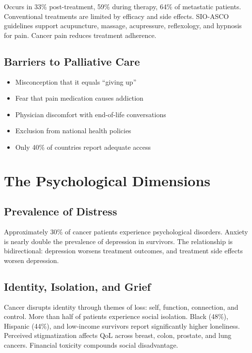 Occurs in 33\% post-treatment, 59\% during therapy, 64\% of metastatic
patients. Conventional treatments are limited by efficacy and side
effects. SIO-ASCO guidelines support acupuncture, massage, acupressure,
reflexology, and hypnosis for pain. Cancer pain reduces treatment
adherence.

\subsection{Barriers to Palliative
Care}\label{barriers-to-palliative-care}

\begin{itemize}
\tightlist
\item
  Misconception that it equals ``giving up''
\item
  Fear that pain medication causes addiction
\item
  Physician discomfort with end-of-life conversations
\item
  Exclusion from national health policies
\item
  Only 40\% of countries report adequate access
\end{itemize}

\newpage

\section{The Psychological
Dimensions}\label{the-psychological-dimensions}

\subsection{Prevalence of Distress}\label{prevalence-of-distress}

Approximately 30\% of cancer patients experience psychological
disorders. Anxiety is nearly double the prevalence of depression in
survivors. The relationship is bidirectional: depression worsens
treatment outcomes, and treatment side effects worsen depression.

\subsection{Identity, Isolation, and
Grief}\label{identity-isolation-and-grief}

Cancer disrupts identity through themes of loss: self, function,
connection, and control. More than half of patients experience social
isolation. Black (48\%), Hispanic (44\%), and low-income survivors
report significantly higher loneliness. Perceived stigmatization affects
QoL across breast, colon, prostate, and lung cancers. Financial toxicity
compounds social disadvantage.

